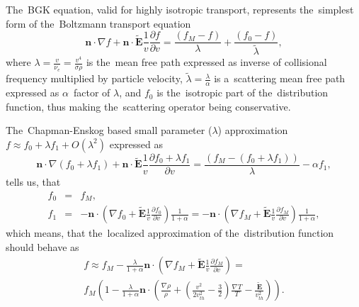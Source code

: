 \documentclass[review]{elsarticle}
\newcommand{\pdv}[2]{\frac{\partial{#1}}{\partial{#2}}}
\newcommand{\vect}[1]{\boldsymbol{#1}}
\newcommand{\dI}{\text{d}}
\newcommand{\mfp}{\lambda}
\newcommand{\tmfp}{\tilde{\lambda}}
\newcommand{\nue}{\nu_{e}}
\newcommand{\vmag}{v}
\newcommand{\vth}{v_{th}}
\newcommand{\vn}{\vect{n}}
\newcommand{\tE}{\vect{\tilde{E}}}
\newcommand{\crs}{\sigma}
\newcommand{\fM}{f_M}
\begin{document}
The~BGK equation, valid for highly isotropic transport, represents 
the~simplest form of the~Boltzmann transport equation
\begin{equation}
  \vn\cdot\nabla f + \vn\cdot\tE\frac{1}{\vmag}\pdv{f}{\vmag} = 
  \frac{\left(\fM - f\right)}{\mfp} + \frac{\left(f_0 - f\right)}{\tmfp} ,
  \label{eq:BGK}
\end{equation}
where $\mfp = \frac{\vmag}{\nue} = \frac{\vmag^4}{\crs\rho}$ is the~mean 
free path expressed as inverse of collisional frequency multiplied by 
particle velocity, $\tmfp = \frac{\mfp}{\alpha}$ is a~scattering mean free path 
expressed as $\alpha$~factor of $\mfp$, and $f_0$ is the~isotropic part
of the~distribution function, thus making the~scattering operator being 
conservative.

The~Chapman-Enskog based small parameter ($\mfp$) approximation 
$f\approx f_0 + \lambda f_1 + O(\lambda^2)$ expressed as
\begin{equation}
  \vn\cdot\nabla (f_0 + \lambda f_1) +
  \vn\cdot\tE\frac{1}{\vmag}\pdv{f_0 + \lambda f_1 }{\vmag}= 
  \frac{\left(\fM - (f_0 + \lambda f_1)\right)}{\mfp} - \alpha f_1,
  \label{eq:CE_BGK}
\end{equation}
tells us, that
\begin{eqnarray}
  f_0 &=& \fM, 
  \nonumber\\
  f_1 &=& - \vn\cdot
  \left(\nabla f_0 + \tE\frac{1}{\vmag}\pdv{f_0}{\vmag} \right)
  \frac{1}{1 + \alpha} 
  = - \vn\cdot
  \left(\nabla\fM + \tE\frac{1}{\vmag}\pdv{\fM}{\vmag} \right)
  \frac{1}{1 + \alpha} ,
  \nonumber
\end{eqnarray}
which means, that the~localized approximation of the~distribution function
should behave as
\begin{multline}
  f \approx \fM - \frac{\mfp}{1 + \alpha}\vn\cdot
  \left(\nabla \fM + \tE\frac{1}{\vmag}
  \pdv{\fM}{\vmag} \right)  
  = \\
  \fM \left(1 - \frac{\mfp}{1 + \alpha}\vn\cdot
  \left(\frac{\nabla\rho}{\rho} + 
  \left( \frac{\vmag^2}{2 \vth^2} - \frac{3}{2}\right) \frac{\nabla T}{T} 
  - \frac{\tE}{\vth^2} \right) \right) .
  \label{eq:f_localized}
\end{multline}
 %
\end{document}
